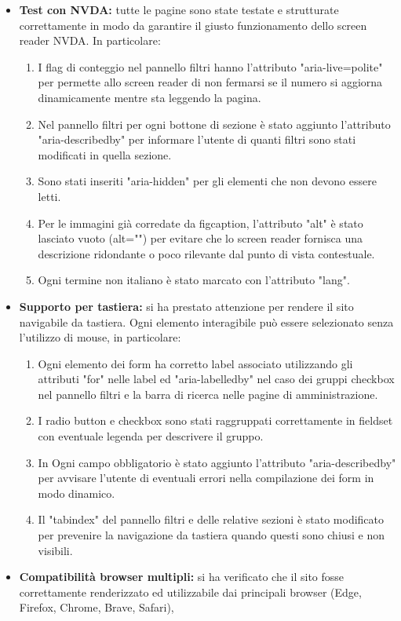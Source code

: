 \documentclass[a4paper,10pt]{article}
\begin{document}
	\begin{itemize}
		\item \textbf{Test con NVDA:} tutte le pagine sono state testate e strutturate correttamente in modo da garantire il giusto funzionamento dello screen reader NVDA. In particolare:
		\begin{enumerate}
			\item I flag di conteggio nel pannello filtri hanno l'attributo "aria-live=polite" per permette allo screen reader di non fermarsi se il numero si aggiorna dinamicamente mentre sta leggendo la pagina.
			\item Nel pannello filtri per ogni bottone di sezione è stato aggiunto l'attributo "aria-describedby" per informare l'utente di quanti filtri sono stati modificati in quella sezione.
			\item Sono stati inseriti "aria-hidden" per gli elementi che non devono essere letti.
			\item Per le immagini già corredate da figcaption, l'attributo "alt" è stato lasciato vuoto (alt="") per evitare che lo screen reader fornisca una descrizione ridondante o poco rilevante dal punto di vista contestuale.
			\item Ogni termine non italiano è stato marcato con l'attributo "lang".
		\end{enumerate}
		\item \textbf{Supporto per tastiera:} si ha prestato attenzione per rendere il sito navigabile da tastiera. Ogni elemento interagibile può essere selezionato senza l'utilizzo di mouse, in particolare:
		\begin{enumerate}
			\item Ogni elemento dei form ha corretto label associato utilizzando gli attributi "for" nelle label ed "aria-labelledby" nel caso dei gruppi checkbox nel pannello filtri e la barra di ricerca nelle pagine di amministrazione.
			\item I radio button e checkbox sono stati raggruppati correttamente in fieldset con eventuale legenda per descrivere il gruppo.
			\item In Ogni campo obbligatorio è stato aggiunto l'attributo "aria-describedby" per avvisare l'utente di eventuali errori nella compilazione dei form in modo dinamico.
			\item Il "tabindex" del pannello filtri e delle relative sezioni è stato modificato per prevenire la navigazione da tastiera quando questi sono chiusi e non visibili.
		\end{enumerate}
		\item \textbf{Compatibilità browser multipli:} si ha verificato che il sito fosse correttamente renderizzato ed utilizzabile dai principali browser (Edge, Firefox, Chrome, Brave, Safari),

\end{itemize}
\end{document}
